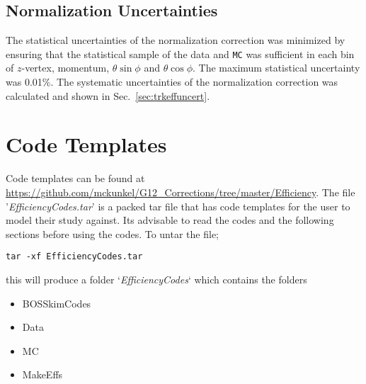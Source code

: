 \documentclass[11pt,a4paper]{article}
\newcommand{\abbr}[1]{\textsc{\texttt{#1}}}
\begin{document}
\FloatBarrier

\subsection{Normalization Uncertainties}
The statistical uncertainties of the normalization correction was minimized by ensuring that the statistical sample of the data and \abbr{MC} was sufficient in each bin of $z$-vertex, momentum, $\theta \sin\phi$ and $\theta \cos\phi$. The maximum statistical uncertainty was 0.01\%. The systematic uncertainties of the normalization correction was calculated and shown in Sec.~\ref{sec:trkeffuncert}.

\section{Code Templates}
Code templates can be found at
 \url{https://github.com/mckunkel/G12_Corrections/tree/master/Efficiency}.
The file '\emph{EfficiencyCodes.tar}' is a packed tar file that has code templates for the user to model their study against. Its advisable to read the codes and the following sections before using the codes.
To untar the file;
\begin{lstlisting}
tar -xf EfficiencyCodes.tar
\end{lstlisting}
this will produce a folder \newline
`\emph{EfficiencyCodes}` \newline
which contains the folders
\begin{itemize}
	\item BOSSkimCodes
	\item Data
	\item MC
	\item MakeEffs
\end{itemize}
\end{document}
